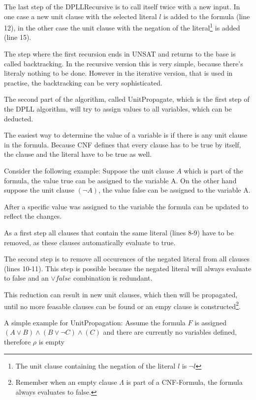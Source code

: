 The last step of the DPLLRecursive is to call itself twice with a new input. In one case a new unit clause with the selected literal $l$ is added to the formula (line 12), in the other case the unit clause with the negation of the literal\footnote{The unit clause containing the negation of the literal $l$ is $\lnot l$} is added (line 15).

The step where the first recursion ends in UNSAT and returns to the base is called backtracking. In the recursive version this is very simple, because there's literaly nothing to be done. However in the iterative version, that is used in practise, the backtracking can be very sophisticated.

The second part of the algorithm, called UnitPropagate, which is the first step of the DPLL algorithm, will try to assign values to all variables, which can be deducted.

The easiest way to determine the value of a variable is if there is any unit clause in the formula. Because CNF defines that every clause has to be true by itself, the clause and the literal have to be true as well.

Consider the following example: Suppose the unit clause $A$ which is part of the formula, the value true can be assigned to the variable A. On the other hand suppose the unit clause $(\lnot A)$, the value false can be assigned to the variable A.

After a specific value was assigned to the variable the formula can be updated to reflect the changes. 

As a first step all clauses that contain the same literal (lines 8-9) have to be removed, as these clauses automatically evaluate to true. 

The second step is to remove all occurences of the negated literal from all clauses (lines 10-11). This step is possible because the negated literal will always evaluate to false and an $\lor false$ combination is redundant.

This reduction can result in new unit clauses, which then will be propagated, until no more feasable clauses can be found or an empy clause is constructed\footnote{Remember when an empty clause $\Lambda$ is part of a CNF-Formula, the formula always evaluates to false.}.

A simple example for UnitPropagation: 
Assume the formula $F$ is assigned $(A \lor B ) \land (B \lor \lnot C) \land (C)$ and there are currently no variables defined, therefore $\rho$ is empty

